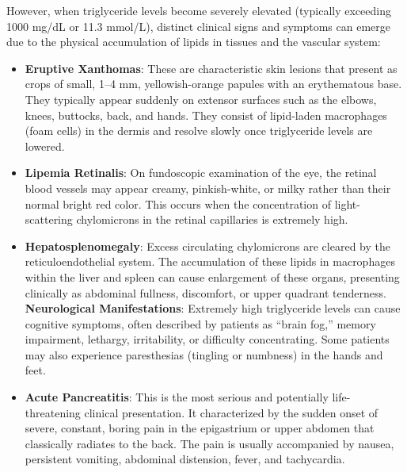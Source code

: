 However, when triglyceride levels become severely elevated (typically exceeding 1000 mg/dL or 11.3 mmol/L), distinct clinical signs and symptoms can emerge due to the physical accumulation of lipids in tissues and the vascular system:
\begin{itemize}
    \item \textbf{Eruptive Xanthomas}: These are characteristic skin lesions that present as crops of small, 1--4 mm, yellowish-orange papules with an erythematous base. They typically appear suddenly on extensor surfaces such as the elbows, knees, buttocks, back, and hands. They consist of lipid-laden macrophages (foam cells) in the dermis and resolve slowly once triglyceride levels are lowered.
    \item \textbf{Lipemia Retinalis}: On fundoscopic examination of the eye, the retinal blood vessels may appear creamy, pinkish-white, or milky rather than their normal bright red color. This occurs when the concentration of light-scattering chylomicrons in the retinal capillaries is extremely high.
    \item \textbf{Hepatosplenomegaly}: Excess circulating chylomicrons are cleared by the reticuloendothelial system. The accumulation of these lipids in macrophages within the liver and spleen can cause enlargement of these organs, presenting clinically as abdominal fullness, discomfort, or upper quadrant tenderness.
    \textbf{Neurological Manifestations}: Extremely high triglyceride levels can cause cognitive symptoms, often described by patients as ``brain fog,'' memory impairment, lethargy, irritability, or difficulty concentrating. Some patients may also experience paresthesias (tingling or numbness) in the hands and feet.
    \item \textbf{Acute Pancreatitis}: This is the most serious and potentially life-threatening clinical presentation. It characterized by the sudden onset of severe, constant, boring pain in the epigastrium or upper abdomen that classically radiates to the back. The pain is usually accompanied by nausea, persistent vomiting, abdominal distension, fever, and tachycardia.
\end{itemize}

